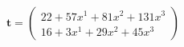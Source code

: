 \documentclass[preview]{standalone}
\begin{document}
\begin{align*}
\mathbf{t} = \begin{pmatrix}22 + 57x^{1} + 81x^{2} + 131x^{3} \\ 16 + 3x^{1} + 29x^{2} + 45x^{3}\end{pmatrix}
\end{align*}
\end{document}
